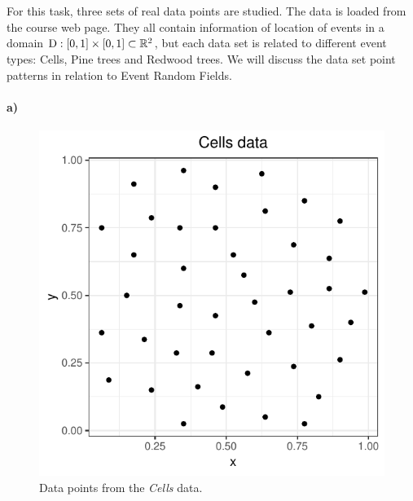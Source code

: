 \section{}
\label{sec:problem1}
For this task, three sets of real data points are studied. The data is loaded from the course web page. They all contain information of location of events in a domain $\textrm{D} : [0,1]\times[0,1] \subset \mathbb{R}^2$, but each data set is related to different event types: Cells, Pine trees and Redwood trees. We will discuss the data set point patterns in relation to Event Random Fields.

\paragraph{a)}

\begin{figure}
    \centering
    \includegraphics[scale=0.9]{figures/prob1_cells_points.pdf}
    \caption{Data points from the \textit{Cells} data.}
    \label{fig:cells_points}
\end{figure}

